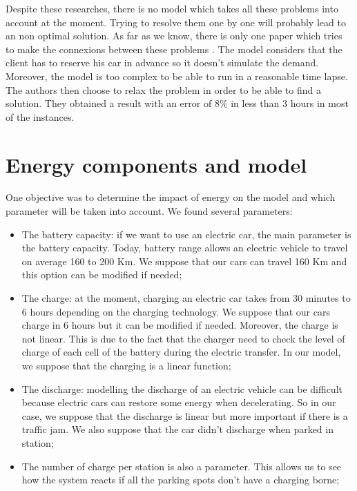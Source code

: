 \begin{bibunit}[ieeetr]
Despite these researches, there is no model  which takes all these problems into account at the moment.
Trying to resolve them one by one will probably lead to an non optimal solution.
As far as we know, there is only one paper which tries to make the connexions between these problems \cite{boyaci_optimization_2015}.
The model considers that the client has to reserve his car in advance so it doesn't simulate the demand.
Moreover, the model is too complex to be able to run in a reasonable time lapse.
The authors then choose to relax the problem in order to be able to find a solution.
They obtained a result with an error of 8\% in less than 3 hours in most of the instances.

\newpage
\section{Energy components and model}
One objective was to determine the impact of energy on the model and which parameter will be taken into account.
We found several parameters:

\begin{itemize}
\item
The battery capacity: if we want to use an electric car, the main parameter is the battery capacity.
Today, battery range allows an electric vehicle to travel on average 160 to 200 Km.
We suppose that our cars can travel 160 Km and this option can be modified if needed;

\item
The charge: at the moment, charging an electric car takes from 30 minutes to 6 hours depending on the charging technology.
We suppose that our cars charge in 6 hours but it can be modified if needed.
Moreover, the charge is not linear.
This is due to the fact that the charger need to check the level of charge of each cell of the battery during the electric transfer.
In our model, we suppose that the charging is a linear function;

\item
The discharge: modelling the  discharge of an electric vehicle can be difficult because electric cars can restore some energy when decelerating.
So in our case, we suppose that the discharge is linear but more important if there is a traffic jam.
We also suppose that the car didn't discharge when parked in station;

\item
The number of charge per station is also a parameter.
This allows us to see how the system reacts if all the parking spots don't have a charging borne;


\end{itemize}
\end{bibunit}
